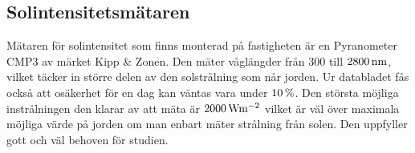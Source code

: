 \subsection{Solintensitetsmätaren}\label{subsec:sunmeter}
Mätaren för solintensitet som finns monterad på fastigheten är en Pyranometer CMP3 av märket Kipp \& Zonen. Den mäter våglängder från $300$ till $\unit[2800]{nm}$, vilket täcker in större delen av den solstrålning som når jorden. Ur databladet fås också att osäkerhet för en dag kan väntas vara under $\unit[10]{\%}$. Den största möjliga instrålningen den klarar av att mäta är $\unit[2000]{W m^{-2}}$ vilket är väl över maximala möjliga värde på jorden om man enbart mäter strålning från solen. Den uppfyller gott och väl behoven för studien.\cite{datasheet_sun}



